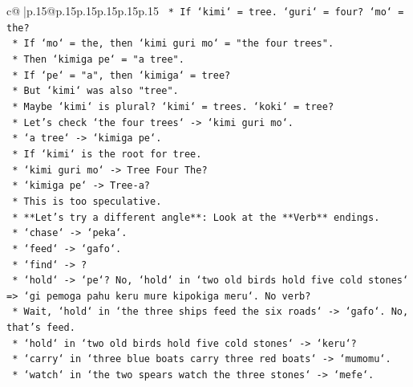 \documentclass{article}
\begin{document}
{\begin{supertabular}{c@{$\;$}|p{.15\linewidth}@{}p{.15\linewidth}p{.15\linewidth}p{.15\linewidth}p{.15\linewidth}p{.15\linewidth}}
{{{\texttt{                            *   If `kimi` = tree. `guri` = four? `mo` = the?} \\
\texttt{                            *   If `mo` = the, then `kimi guri mo` = "the four trees".} \\
\texttt{                            *   Then `kimiga pe` = "a tree".} \\
\texttt{                            *   If `pe` = "a", then `kimiga` = tree?} \\
\texttt{                            *   But `kimi` was also "tree".} \\
\texttt{                            *   Maybe `kimi` is plural? `kimi` = trees. `koki` = tree?} \\
\texttt{                            *   Let's check `the four trees` {-}> `kimi guri mo`.} \\
\texttt{                            *   `a tree` {-}> `kimiga pe`.} \\
\texttt{                            *   If `kimi` is the root for tree.} \\
\texttt{                            *   `kimi guri mo` {-}> Tree Four The?} \\
\texttt{                            *   `kimiga pe` {-}> Tree{-}a?} \\
\texttt{                            *   This is too speculative.} \\
\texttt{                            *   **Let's try a different angle**: Look at the **Verb** endings.} \\
\texttt{                            *   `chase` {-}> `peka`.} \\
\texttt{                            *   `feed` {-}> `gafo`.} \\
\texttt{                            *   `find` {-}> ?} \\
\texttt{                            *   `hold` {-}> `pe`? No, `hold` in `two old birds hold five cold stones` => `gi pemoga pahu keru mure kipokiga meru`. No verb?} \\
\texttt{                            *   Wait, `hold` in `the three ships feed the six roads` {-}> `gafo`. No, that's feed.} \\
\texttt{                            *   `hold` in `two old birds hold five cold stones` {-}> `keru`?} \\
\texttt{                            *   `carry` in `three blue boats carry three red boats` {-}> `mumomu`.} \\
\texttt{                            *   `watch` in `the two spears watch the three stones` {-}> `mefe`.} \\
}}}
\end{supertabular}}
\end{document}
